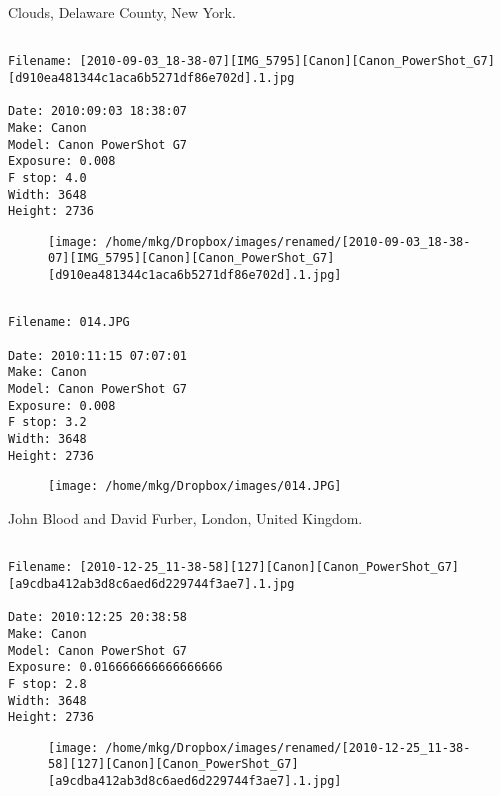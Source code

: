 \clearpage
\onecolumn
\noindent Clouds, Delaware County, New York.
\noindent
\begin{lstlisting}

Filename: [2010-09-03_18-38-07][IMG_5795][Canon][Canon_PowerShot_G7][d910ea481344c1aca6b5271df86e702d].1.jpg

Date: 2010:09:03 18:38:07
Make: Canon
Model: Canon PowerShot G7
Exposure: 0.008
F stop: 4.0
Width: 3648
Height: 2736
\end{lstlisting}
\clearpage

\begin{figure}
\texttt{[image: /home/mkg/Dropbox/images/renamed/[2010-09-03\_18-38-07][IMG\_5795][Canon][Canon\_PowerShot\_G7][d910ea481344c1aca6b5271df86e702d].1.jpg]}
\end{figure}
    
\clearpage
\onecolumn
\noindent 
\noindent
\begin{lstlisting}

Filename: 014.JPG

Date: 2010:11:15 07:07:01
Make: Canon
Model: Canon PowerShot G7
Exposure: 0.008
F stop: 3.2
Width: 3648
Height: 2736
\end{lstlisting}
\clearpage

\begin{figure}
\texttt{[image: /home/mkg/Dropbox/images/014.JPG]}
\end{figure}
    
\clearpage
\onecolumn
\noindent John Blood and David Furber, London, United Kingdom.
\noindent
\begin{lstlisting}

Filename: [2010-12-25_11-38-58][127][Canon][Canon_PowerShot_G7][a9cdba412ab3d8c6aed6d229744f3ae7].1.jpg

Date: 2010:12:25 20:38:58
Make: Canon
Model: Canon PowerShot G7
Exposure: 0.016666666666666666
F stop: 2.8
Width: 3648
Height: 2736
\end{lstlisting}
\clearpage

\begin{figure}
\texttt{[image: /home/mkg/Dropbox/images/renamed/[2010-12-25\_11-38-58][127][Canon][Canon\_PowerShot\_G7][a9cdba412ab3d8c6aed6d229744f3ae7].1.jpg]}
\end{figure}
    
